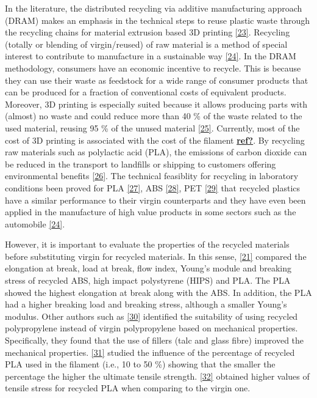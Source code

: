 \documentclass[conference,final,]{IEEEtran}
\begin{document}
In the literature, the distributed recycling via additive manufacturing
approach (DRAM) makes an emphasis in the technical steps to reuse
plastic waste through the recycling chains for material extrusion based
3D printing \protect\hyperlink{ref-Little2020}{{[}23{]}}. Recycling
(totally or blending of virgin/reused) of raw material is a method of
special interest to contribute to manufacture in a sustainable way
\protect\hyperlink{ref-Zhao2018}{{[}24{]}}. In the DRAM methodology,
consumers have an economic incentive to recycle. This is because they
can use their waste as feedstock for a wide range of consumer products
that can be produced for a fraction of conventional costs of equivalent
products. Moreover, 3D printing is especially suited because it allows
producing parts with (almost) no waste and could reduce more than 40 \%
of the waste related to the used material, reusing 95 \% of the unused
material \protect\hyperlink{ref-Petrovic2011}{{[}25{]}}. Currently, most
of the cost of 3D printing is associated with the cost of the filament
\protect\hyperlink{ref-ref}{\textbf{ref?}}. By recycling raw materials
such as polylactic acid (PLA), the emissions of carbon dioxide can be
reduced in the transport to landfills or shipping to customers offering
environmental benefits \protect\hyperlink{ref-Santander2020}{{[}26{]}}.
The technical feasiblity for recycling in laboratory conditions been
proved for PLA \protect\hyperlink{ref-CruzSanchez2017}{{[}27{]}}, ABS
\protect\hyperlink{ref-Vidakis2020}{{[}28{]}}, PET
\protect\hyperlink{ref-Zander2018}{{[}29{]}} that recycled plastics have
a similar performance to their virgin counterparts and they have even
been applied in the manufacture of high value products in some sectors
such as the automobile \protect\hyperlink{ref-Zhao2018}{{[}24{]}}.

However, it is important to evaluate the properties of the recycled
materials before substituting virgin for recycled materials. In this
sense, \protect\hyperlink{ref-Kumar2018b}{{[}21{]}} compared the
elongation at break, load at break, flow index, Young's module and
breaking stress of recycled ABS, high impact polystyrene (HIPS) and PLA.
The PLA showed the highest elongation at break along with the ABS. In
addition, the PLA had a higher breaking load and breaking stress,
although a smaller Young's modulus. Other authors such as
\protect\hyperlink{ref-Gu2016}{{[}30{]}} identified the suitability of
using recycled polypropylene instead of virgin polypropylene based on
mechanical properties. Specifically, they found that the use of fillers
(talc and glass fibre) improved the mechanical properties.
\protect\hyperlink{ref-Babagowda2018}{{[}31{]}} studied the influence of
the percentage of recycled PLA used in the filament (i.e., 10 to 50 \%)
showing that the smaller the percentage the higher the ultimate tensile
strength. \protect\hyperlink{ref-Pinho2020}{{[}32{]}} obtained higher
values of tensile stress for recycled PLA when comparing to the virgin
one.
\end{document}
